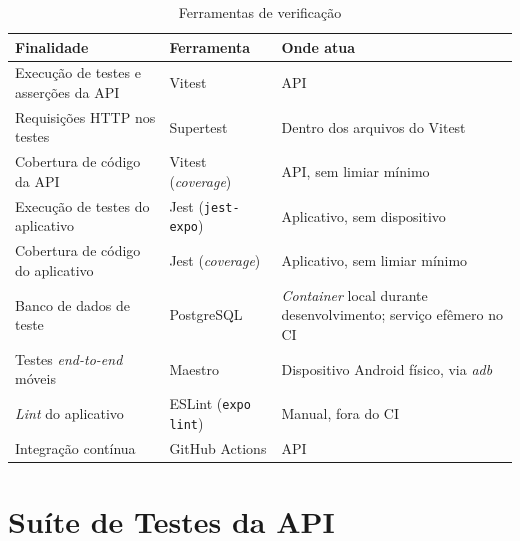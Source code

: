 \begin{table}[H]
\centering
\caption{Ferramentas de verificação}
\label{tab:test-tooling}
\small
\begin{tabular}{|p{4.4cm}|p{4.0cm}|p{5.0cm}|}
\hline
\textbf{Finalidade} &
\textbf{Ferramenta} &
\textbf{Onde atua} \\

\hline

Execução de testes e asserções da API &
Vitest &
API \\

\hline

Requisições HTTP nos testes &
Supertest &
Dentro dos arquivos do Vitest \\

\hline

Cobertura de código da API &
Vitest (\textit{coverage}) &
API, sem limiar mínimo \\

\hline

Execução de testes do aplicativo &
Jest (\texttt{jest-expo}) &
Aplicativo, sem dispositivo \\

\hline

Cobertura de código do aplicativo &
Jest (\textit{coverage}) &
Aplicativo, sem limiar mínimo \\

\hline

Banco de dados de teste &
PostgreSQL &
\textit{Container} local durante desenvolvimento; serviço efêmero no CI \\

\hline

Testes \textit{end-to-end} móveis &
Maestro &
Dispositivo Android físico, via \textit{adb} \\

\hline

\textit{Lint} do aplicativo &
ESLint (\texttt{expo lint}) &
Manual, fora do CI \\

\hline

Integração contínua &
GitHub Actions &
API \\

\hline
\end{tabular}
\end{table}

\section{Suíte de Testes da API}\label{sec:test-api}

